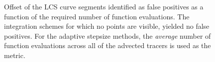 \begin{figure}[htpb]
    \centering
    
    \caption[Offset of the LCS curve segments identified as false positives,
    as a function of the required number of function evaluations]
    {Offset of the LCS curve segments identified as false positives as a
        function of the required number of function evaluations. The
        integration schemes for which no points are visible, yielded
        no false positives. For the adaptive stepsize methods, the
        \emph{average} number of function evaluations across all of the advected
    tracers is used as the metric.}
    \label{fig:lcs_err_fp_fp}
\end{figure}
